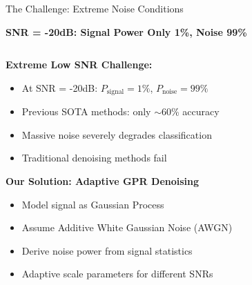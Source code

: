 \documentclass[aspectratio=169]{beamer}
\begin{document}
\begin{frame}{The Challenge: Extreme Noise Conditions}
\begin{center}
\textcolor{zjutred}{\Large \textbf{SNR = -20dB: Signal Power Only 1\%, Noise 99\%}}
\end{center}

\vspace{0.5cm}
\begin{columns}
\begin{column}{0.6\textwidth}
\textbf{Extreme Low SNR Challenge:}
\begin{itemize}
\item At SNR = -20dB: $P_{\text{signal}} = 1\%$, $P_{\text{noise}} = 99\%$
\item Previous SOTA methods: only $\sim$60\% accuracy
\item Massive noise severely degrades classification
\item Traditional denoising methods fail
\end{itemize}

\vspace{0.3cm}
\textbf{Our Solution: Adaptive GPR Denoising}
\begin{itemize}
\item Model signal as Gaussian Process
\item Assume Additive White Gaussian Noise (AWGN)
\item Derive noise power from signal statistics
\item Adaptive scale parameters for different SNRs
\end{itemize}
\end{column}
\begin{column}{0.4\textwidth}
\begin{center}
\end{center}
\end{column}
\end{columns}
\end{frame}
\end{document}
